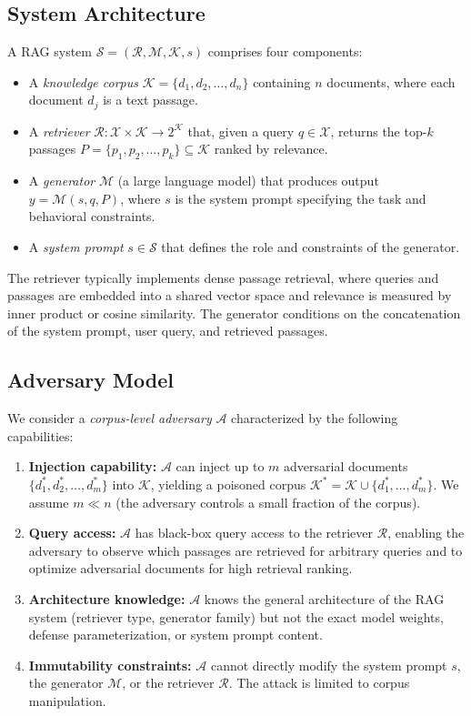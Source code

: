 \documentclass[journal,10pt]{IEEEtran}
\newcommand{\calR}{\mathcal{R}}
\newcommand{\calM}{\mathcal{M}}
\newcommand{\calA}{\mathcal{A}}
\newcommand{\calS}{\mathcal{S}}
\newcommand{\calK}{\mathcal{K}}
\newcommand{\calX}{\mathcal{X}}
\begin{document}
\subsection{System Architecture}
A RAG system $\calS = (\calR, \calM, \calK, s)$ comprises four components:
\begin{itemize}[leftmargin=*]
\item A \emph{knowledge corpus} $\calK = \{d_1, d_2, \ldots, d_n\}$ containing $n$ documents, where each document $d_j$ is a text passage.
\item A \emph{retriever} $\calR: \calX \times \calK \to 2^{\calK}$ that, given a query $q \in \calX$, returns the top-$k$ passages $P = \{p_1, p_2, \ldots, p_k\} \subseteq \calK$ ranked by relevance.
\item A \emph{generator} $\calM$ (a large language model) that produces output $y = \calM(s, q, P)$, where $s$ is the system prompt specifying the task and behavioral constraints.
\item A \emph{system prompt} $s \in \calS$ that defines the role and constraints of the generator.
\end{itemize}

The retriever typically implements dense passage retrieval, where queries and passages are embedded into a shared vector space and relevance is measured by inner product or cosine similarity. The generator conditions on the concatenation of the system prompt, user query, and retrieved passages.

\subsection{Adversary Model}
We consider a \emph{corpus-level adversary} $\calA$ characterized by the following capabilities:

\begin{enumerate}[leftmargin=*]
\item \textbf{Injection capability:} $\calA$ can inject up to $m$ adversarial documents $\{d_1^*, d_2^*, \ldots, d_m^*\}$ into $\calK$, yielding a poisoned corpus $\calK^* = \calK \cup \{d_1^*, \ldots, d_m^*\}$. We assume $m \ll n$ (the adversary controls a small fraction of the corpus).
\item \textbf{Query access:} $\calA$ has black-box query access to the retriever $\calR$, enabling the adversary to observe which passages are retrieved for arbitrary queries and to optimize adversarial documents for high retrieval ranking.
\item \textbf{Architecture knowledge:} $\calA$ knows the general architecture of the RAG system (retriever type, generator family) but not the exact model weights, defense parameterization, or system prompt content.
\item \textbf{Immutability constraints:} $\calA$ cannot directly modify the system prompt $s$, the generator $\calM$, or the retriever $\calR$. The attack is limited to corpus manipulation.
\end{enumerate}
\end{document}
